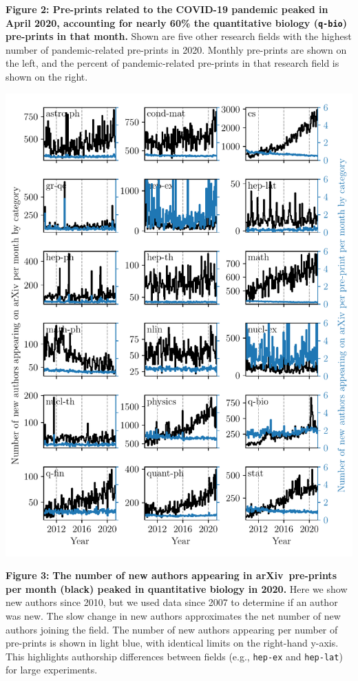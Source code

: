 \documentclass[a4paper,12pt]{article}
\newcommand{\arxiv}{arXiv}
\begin{document}
\noindent \textbf{Figure 2: Pre-prints related to the COVID-19 pandemic peaked in April 2020, accounting for nearly 60\% the quantitative biology (\texttt{q-bio}) pre-prints in that month.} Shown are five other research fields with the highest number of pandemic-related pre-prints in 2020. Monthly pre-prints are shown on the left, and the percent of pandemic-related pre-prints in that research field is shown on the right.

\newpage

\begin{center}
	\includegraphics[width=0.95\linewidth]{Casey_Figure_3} %
\end{center}

\noindent \textbf{Figure 3:} \textbf{The number of new authors appearing in \arxiv\ pre-prints per month (black) peaked in quantitative biology in 2020.} Here we show new authors since 2010, but we used data since 2007 to determine if an author was new. The slow change in new authors  approximates the net number of new authors joining the field. The number of new authors appearing per number of pre-prints is shown in light blue, with identical limits on the right-hand y-axis. This highlights authorship differences between fields (e.g., \texttt{hep-ex} and \texttt{hep-lat}) for large experiments.
\end{document}
